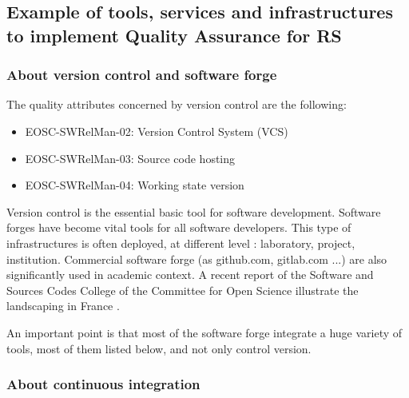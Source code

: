 \subsection{Example of tools, services and infrastructures to implement Quality Assurance for RS}


\subsubsection{About version control and software forge}

The quality attributes concerned by version control are the following:
\begin{itemize}
  \item EOSC-SWRelMan-02: Version Control System (VCS)
  \item EOSC-SWRelMan-03: Source code hosting
  \item EOSC-SWRelMan-04: Working state version
\end{itemize}

Version control is the essential basic tool for software development.
Software forges have become vital tools for all software developers.
This type of infrastructures is often deployed, at different level :
laboratory, project, institution. Commercial software forge (as
github.com, gitlab.com ...) are also significantly used in academic
context. A recent report of the Software and
Sources Codes College of the Committee for Open Science illustrate the
landscaping in France \cite{leberre:hal-04208924}.

An important point is that most of the software forge integrate a huge
variety of tools, most of them listed below, and not only control
version.


\subsubsection{About continuous integration}

